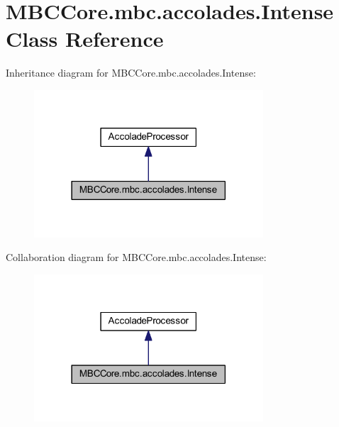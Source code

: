 \hypertarget{class_m_b_c_core_1_1mbc_1_1accolades_1_1_intense}{\section{M\-B\-C\-Core.\-mbc.\-accolades.\-Intense Class Reference}
\label{class_m_b_c_core_1_1mbc_1_1accolades_1_1_intense}
}


Inheritance diagram for M\-B\-C\-Core.\-mbc.\-accolades.\-Intense\-:\nopagebreak
\begin{figure}[H]
\begin{center}
\leavevmode
\includegraphics[width=242pt]{class_m_b_c_core_1_1mbc_1_1accolades_1_1_intense__inherit__graph}
\end{center}
\end{figure}


Collaboration diagram for M\-B\-C\-Core.\-mbc.\-accolades.\-Intense\-:\nopagebreak
\begin{figure}[H]
\begin{center}
\leavevmode
\includegraphics[width=242pt]{class_m_b_c_core_1_1mbc_1_1accolades_1_1_intense__coll__graph}
\end{center}
\end{figure}

